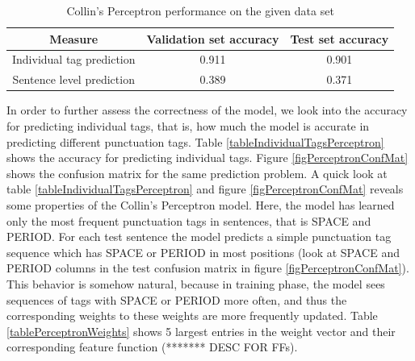 \documentclass[twoside,12pt]{article}
\begin{document}
\begin{table}[H]\footnotesize
  \caption{Collin's Perceptron performance on the given data set}
\begin{center}
    \begin{tabular}{| c | c | c | }
    \hline
    \textbf{ Measure} & \textbf{Validation set accuracy} & \textbf{Test set accuracy} \\ \hline
    Individual tag prediction & 0.911 & 0.901  \\ \hline
    Sentence level prediction & 0.389 & 0.371  \\ \hline
    \end{tabular}
    \label{tablePredPerceptron}
\end{center}
\end{table}


In order to further assess the correctness of the model, we look into the accuracy for predicting individual tags, that is, how much the model is accurate in predicting different punctuation tags. Table \ref{tableIndividualTagsPerceptron} shows the accuracy for predicting individual tags. Figure \ref{figPerceptronConfMat} shows the confusion matrix for the same prediction problem. A quick look at table \ref{tableIndividualTagsPerceptron} and figure \ref{figPerceptronConfMat} reveals some properties of the Collin's Perceptron model. Here, the model has learned only the most frequent punctuation tags in sentences, that is SPACE and PERIOD. For each test sentence the model predicts a simple punctuation tag sequence which has SPACE or PERIOD in most positions (look at SPACE and PERIOD columns in the test confusion matrix in figure \ref{figPerceptronConfMat}). This behavior is somehow natural, because in training phase, the model sees sequences of tags with SPACE or PERIOD more often, and thus the corresponding weights to these weights are more frequently updated. Table \ref{tablePerceptronWeights} shows 5 largest entries in the weight vector and their corresponding feature function (******* DESC FOR FFs).
\end{document}
